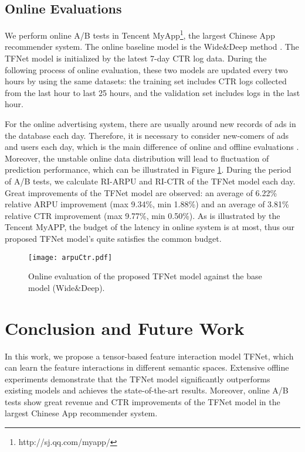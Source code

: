 \documentclass[sigconf]{acmart}
\begin{document}
\subsection{Online Evaluations}
We perform online A/B tests in Tencent MyApp\footnote{http://sj.qq.com/myapp/}, the largest Chinese App recommender system. The online baseline model is the Wide\&Deep method \cite{cheng2016wide}. The TFNet model is initialized by the latest 7-day CTR log data. During the following process of online evaluation, these two models are updated every two hours by using the same datasets: the training set includes CTR logs collected from the last hour to last 25 hours, and the validation set includes logs in the last hour.

For the online advertising system, there are usually around   new records of ads in the database each day. Therefore, it is necessary to consider new-comers of ads and users each day, which is the main difference of online and offline evaluations \cite{chan2018convolutional}. Moreover, the unstable online data distribution will lead to fluctuation of prediction performance, which can be illustrated in Figure \ref{online}. During the period of A/B tests, we calculate RI-ARPU and RI-CTR of the TFNet model each day. Great improvements of the TFNet model are observed: an average of 6.22\% relative ARPU improvement (max 9.34\%, min 1.88\%) and an average of 3.81\% relative CTR improvement (max 9.77\%, min 0.50\%). As is illustrated by the Tencent MyAPP, the budget of the latency in online system is  at most, thus our proposed TFNet model's  quite satisfies the common budget.

\begin{figure}[t]
\setlength{\abovecaptionskip}{0pt}  \setlength{\belowcaptionskip}{0pt}  \centering
\small
\texttt{[image: arpuCtr.pdf]}
\caption{Online evaluation of the proposed TFNet model against the base model (Wide\&Deep). }
\label{online}
\end{figure}

\section{Conclusion and Future Work}
In this work, we propose a tensor-based feature interaction model TFNet, which can learn the feature interactions in different semantic spaces. Extensive offline experiments demonstrate that the TFNet model significantly outperforms existing models and achieves the state-of-the-art results. Moreover, online A/B tests show great revenue and CTR improvements of the TFNet model in the largest Chinese App recommender system.
\end{document}
